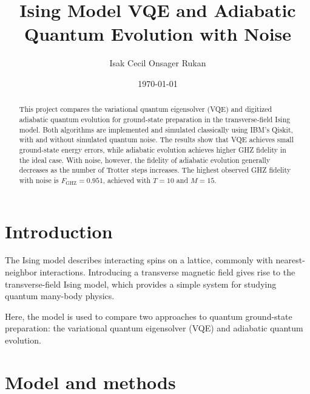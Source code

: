 \documentclass[aps,prl,reprint,amsmath,amssymb,twocolumn,preprintnumbers,superscriptaddress,10pt]{revtex4-2}
\begin{document}

\title{Ising Model VQE and Adiabatic Quantum Evolution with Noise}

\author{Isak Cecil Onsager Rukan}



\date{\today}



\begin{abstract}
    This project compares the variational quantum eigensolver (VQE)
    and digitized adiabatic quantum evolution for ground-state
    preparation in the transverse-field Ising model.
    Both algorithms are implemented and simulated classically
    using IBM's Qiskit, with and without simulated quantum noise.
    The results show that VQE achieves small ground-state energy
    errors, while adiabatic evolution achieves higher GHZ fidelity
    in the ideal case. With noise, however, the fidelity of
    adiabatic evolution generally decreases as the number of
    Trotter steps increases. The highest observed GHZ fidelity
    with noise is $F_{\mathrm{GHZ}}=0.951$, achieved with
    $T=10$ and $M=15$.
\end{abstract}



\maketitle

\section{Introduction}

The Ising model describes interacting spins on a lattice, commonly
with nearest-neighbor interactions. Introducing a transverse magnetic
field gives rise to the transverse-field Ising model, which provides
a simple system for studying quantum many-body physics.

Here, the model is used to compare two approaches to quantum
ground-state preparation: the variational quantum eigensolver
(VQE) and adiabatic quantum evolution.

\section{Model and methods}
\end{document}

